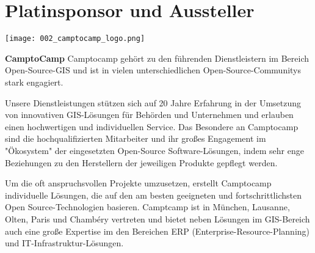 \section*{Platinsponsor und Aussteller}
  \texttt{[image: 002\_camptocamp\_logo.png]}
  \vspace{1.0\baselineskip}
  
\noindent
{\bfseries CamptoCamp} Camptocamp gehört zu den führenden Dienstleistern im Bereich Open-Source-GIS und ist in vielen unterschiedlichen Open-Source-Communitys stark engagiert.

\noindent
Unsere Dienstleistungen stützen sich auf 20 Jahre Erfahrung in der Umsetzung von innovativen GIS-Lösungen für Behörden und Unternehmen und erlauben einen hochwertigen und individuellen Service. Das Besondere an Camptocamp sind die hochqualifizierten Mitarbeiter und ihr großes Engagement im "Ökosystem" der eingesetzten Open-Source Software-Lösungen, indem sehr enge Beziehungen zu den Herstellern der jeweiligen Produkte gepflegt werden.

\noindent
Um die oft anspruchsvollen Projekte umzusetzen, erstellt Camptocamp individuelle Lösungen, die auf den am besten geeigneten und fortschrittlichsten Open Source-Technologien basieren. Camptcamp ist in München, Lausanne, Olten, Paris und Chambéry vertreten und bietet neben Lösungen im GIS-Bereich auch eine große Expertise im den Bereichen ERP (Enterprise-Resource-Planning) und IT-Infrastruktur-Lösungen.
